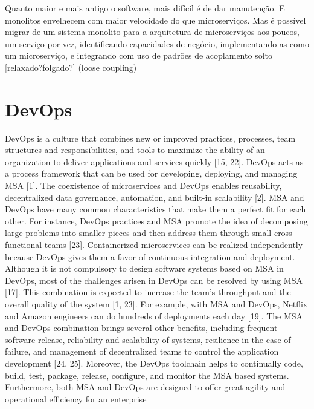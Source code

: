 Quanto maior e mais antigo o software, mais difícil é de dar manutenção. E monolitos envelhecem com maior velocidade do que microserviços. Mas é possível migrar de um sistema monolito para a arquitetura de microserviços aos poucos, um serviço por vez, identificando capacidades de negócio, implementando-as como um microserviço, e integrando com uso de padrões de acoplamento solto [relaxado?folgado?] (loose coupling)

\section{DevOps}
\label{devops}

DevOps is a culture that combines new or improved practices, processes, team structures and responsibilities, and tools to maximize the ability of an organization to deliver applications and services quickly [15, 22]. DevOps acts as a process framework that can be used for developing, deploying, and managing MSA [1]. The coexistence of microservices and DevOps enables reusability, decentralized data governance, automation, and built-in scalability [2]. MSA and DevOps have many common characteristics that make them a perfect fit for each other. For instance, DevOps practices and MSA promote the idea of decomposing large problems into smaller pieces and then address them through small cross-functional teams [23]. Containerized microservices can be realized independently because DevOps gives them a favor of continuous integration and deployment. Although it is not compulsory to design software systems based on MSA in DevOps, most of the challenges arisen in DevOps can be resolved by using MSA [17]. This combination is expected to increase the team’s throughput and the overall quality of the system [1, 23]. For example, with MSA and DevOps, Netflix and Amazon engineers can do hundreds of deployments each day [19]. The MSA and DevOps combination brings several other benefits, including frequent software release, reliability and scalability of systems, resilience in the case of failure, and management of decentralized teams to control the application development [24, 25]. Moreover, the DevOps toolchain helps to continually code, build, test, package, release, configure, and monitor the MSA based systems. Furthermore, both MSA and DevOps are designed to offer great agility and operational efficiency for an enterprise
